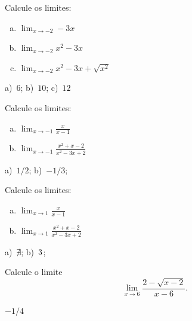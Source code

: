 \begin{exer}
  Calcule os limites:
  \begin{enumerate}[a)]
  \item $\displaystyle\lim_{x\to -2} -3x$\\
  \item $\displaystyle\lim_{x\to -2} x^2-3x$\\    
  \item $\displaystyle\lim_{x\to -2} x^2-3x+\sqrt{x^2}$\\    
  \end{enumerate}
\end{exer}
\begin{resp}
  a)~$6$; b)~$10$; c)~$12$
\end{resp}

\begin{exer}
  Calcule os limites:
  \begin{enumerate}[a)]
  \item $\displaystyle\lim_{x\to -1} \frac{x}{x-1}$\\
  \item $\displaystyle\lim_{x\to -1} \frac{x^2+x-2}{x^2-3x+2}$\\    
  \end{enumerate}
\end{exer}
\begin{resp}
  a)~$1/2$; b)~$-1/3$;
\end{resp}

\begin{exer}
  Calcule os limites:
  \begin{enumerate}[a)]
  \item $\displaystyle\lim_{x\to 1} \frac{x}{x-1}$\\
  \item $\displaystyle\lim_{x\to 1} \frac{x^2+x-2}{x^2-3x+2}$\\    
  \end{enumerate}
\end{exer}
\begin{resp}
  a)~$\nexists$; b)~$\-3$;
\end{resp}

\begin{ex}
  Calcule o limite
  \begin{equation}
    \lim_{x\to 6} \frac{2-\sqrt{x-2}}{x-6}.
  \end{equation}
\end{ex}
\begin{resp}
  $-1/4$
\end{resp}


